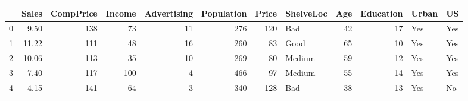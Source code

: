 \begin{tabular}{lrrrrrrlrrll}
\toprule
{} &  Sales &  CompPrice &  Income &  Advertising &  Population &  Price & ShelveLoc &  Age &  Education & Urban &   US \\
\midrule
0 &   9.50 &        138 &      73 &           11 &         276 &    120 &       Bad &   42 &         17 &   Yes &  Yes \\
1 &  11.22 &        111 &      48 &           16 &         260 &     83 &      Good &   65 &         10 &   Yes &  Yes \\
2 &  10.06 &        113 &      35 &           10 &         269 &     80 &    Medium &   59 &         12 &   Yes &  Yes \\
3 &   7.40 &        117 &     100 &            4 &         466 &     97 &    Medium &   55 &         14 &   Yes &  Yes \\
4 &   4.15 &        141 &      64 &            3 &         340 &    128 &       Bad &   38 &         13 &   Yes &   No \\
\bottomrule
\end{tabular}
